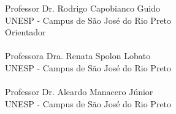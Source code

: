 \fontsize{14}{\baselineskip} \selectfont
Professor Dr. Rodrigo Capobianco Guido \\ 
UNESP - Campus de São José do Rio Preto \\
Orientador \\\\

Professora Dra. Renata Spolon Lobato \\ 
UNESP - Campus de São José do Rio Preto \\\\

Professor Dr. Aleardo Manacero Júnior \\
UNESP - Campus de São José do Rio Preto \\\\